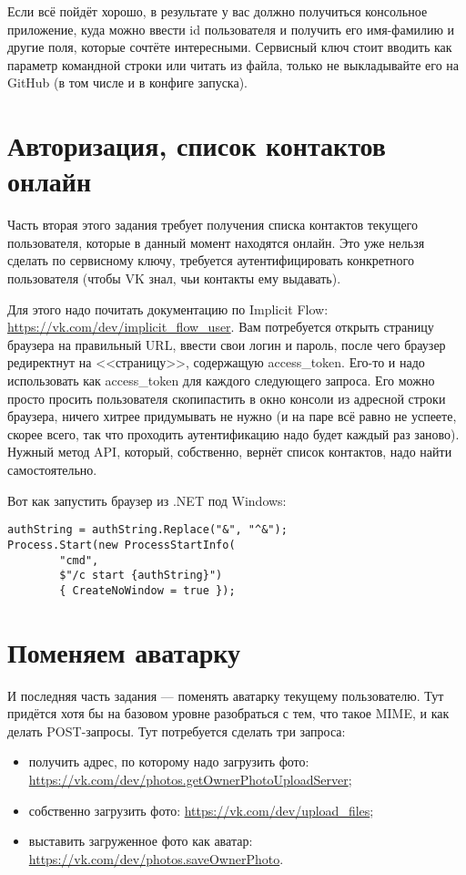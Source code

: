 \documentclass{../../text-style}
\begin{document}
Если всё пойдёт хорошо, в результате у вас должно получиться консольное приложение, куда можно ввести id пользователя и получить его имя-фамилию и другие поля, которые сочтёте интересными. Сервисный ключ стоит вводить как параметр командной строки или читать из файла, только не выкладывайте его на GitHub (в том числе и в конфиге запуска).

\section{Авторизация, список контактов онлайн}

Часть вторая этого задания требует получения списка контактов текущего пользователя, которые в данный момент находятся онлайн. Это уже нельзя сделать по сервисному ключу, требуется аутентифицировать конкретного пользователя (чтобы VK знал, чьи контакты ему выдавать). 

Для этого надо почитать документацию по Implicit Flow: \url{https://vk.com/dev/implicit_flow_user}. Вам потребуется открыть страницу браузера на правильный URL, ввести свои логин и пароль, после чего браузер редиректнут на <<страницу>>, содержащую access\_token. Его-то и надо использовать как access\_token для каждого следующего запроса. Его можно просто просить пользователя скопипастить в окно консоли из адресной строки браузера, ничего хитрее придумывать не нужно (и на паре всё равно не успеете, скорее всего, так что проходить аутентификацию надо будет каждый раз заново). Нужный метод API, который, собственно, вернёт список контактов, надо найти самостоятельно.

Вот как запустить браузер из .NET под Windows:

\begin{verbatim}
authString = authString.Replace("&", "^&");
Process.Start(new ProcessStartInfo(
        "cmd", 
        $"/c start {authString}") 
        { CreateNoWindow = true });
\end{verbatim}

\section{Поменяем аватарку}

И последняя часть задания --- поменять аватарку текущему пользователю. Тут придётся хотя бы на базовом уровне разобраться с тем, что такое MIME, и как делать POST-запросы. Тут потребуется сделать три запроса:

\begin{itemize}
    \item получить адрес, по которому надо загрузить фото: \url{https://vk.com/dev/photos.getOwnerPhotoUploadServer};
    \item собственно загрузить фото: \url{https://vk.com/dev/upload_files};
    \item выставить загруженное фото как аватар: \url{https://vk.com/dev/photos.saveOwnerPhoto}.
\end{itemize}
\end{document}
